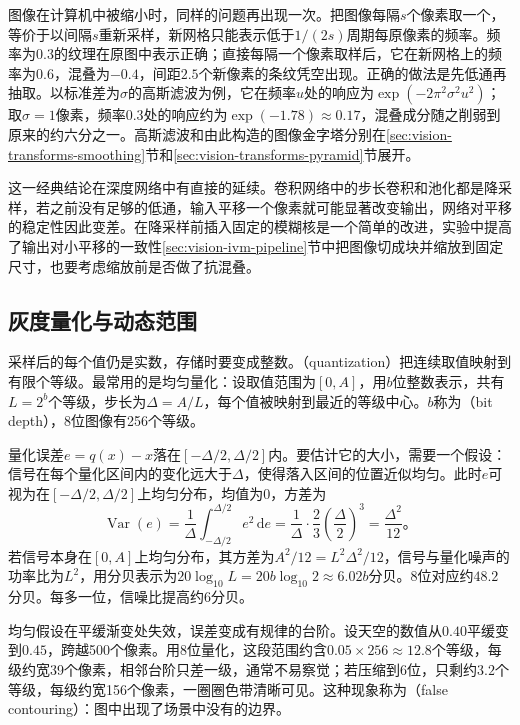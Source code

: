 图像在计算机中被缩小时，同样的问题再出现一次。把图像每隔$s$个像素取一个，等价于以间隔$s$重新采样，新网格只能表示低于$1/(2s)$周期每原像素的频率。频率为$0.3$的纹理在原图中表示正确；直接每隔一个像素取样后，它在新网格上的频率为$0.6$，混叠为$-0.4$，间距$2.5$个新像素的条纹凭空出现。正确的做法是先低通再抽取。以标准差为$\sigma$的高斯滤波为例，它在频率$u$处的响应为$\exp(-2\pi^2\sigma^2u^2)$；取$\sigma=1$像素，频率$0.3$处的响应约为$\exp(-1.78)\approx0.17$，混叠成分随之削弱到原来的约六分之一。高斯滤波和由此构造的图像金字塔分别在\ref{sec:vision-transforms-smoothing}节和\ref{sec:vision-transforms-pyramid}节展开。

这一经典结论在深度网络中有直接的延续。卷积网络中的步长卷积和池化都是降采样，若之前没有足够的低通，输入平移一个像素就可能显著改变输出，网络对平移的稳定性因此变差。在降采样前插入固定的模糊核是一个简单的改进，实验中提高了输出对小平移的一致性\ref{sec:vision-ivm-pipeline}节中把图像切成块并缩放到固定尺寸，也要考虑缩放前是否做了抗混叠。

\subsection{灰度量化与动态范围}
\label{sec:vision-formation-quantization}

采样后的每个值仍是实数，存储时要变成整数。（quantization）把连续取值映射到有限个等级。最常用的是均匀量化：设取值范围为$[0,A]$，用$b$位整数表示，共有$L=2^b$个等级，步长为$\Delta=A/L$，每个值被映射到最近的等级中心。$b$称为（bit depth），8位图像有256个等级。

量化误差$e=q(x)-x$落在$[-\Delta/2,\Delta/2]$内。要估计它的大小，需要一个假设：信号在每个量化区间内的变化远大于$\Delta$，使得落入区间的位置近似均匀。此时$e$可视为在$[-\Delta/2,\Delta/2]$上均匀分布，均值为$0$，方差为
\begin{equation}
  \operatorname{Var}(e)=\frac{1}{\Delta}\int_{-\Delta/2}^{\Delta/2}e^2\,\mathrm{d}e
  =\frac{1}{\Delta}\cdot\frac{2}{3}\left(\frac{\Delta}{2}\right)^3
  =\frac{\Delta^2}{12}\text{。}
  \label{eq:vision-formation-quantization-noise}
\end{equation}
若信号本身在$[0,A]$上均匀分布，其方差为$A^2/12=L^2\Delta^2/12$，信号与量化噪声的功率比为$L^2$，用分贝表示为$20\log_{10}L=20b\log_{10}2\approx6.02b$分贝。8位对应约$48.2$分贝。每多一位，信噪比提高约6分贝。

均匀假设在平缓渐变处失效，误差变成有规律的台阶。设天空的数值从$0.40$平缓变到$0.45$，跨越500个像素。用8位量化，这段范围约含$0.05\times256\approx12.8$个等级，每级约宽39个像素，相邻台阶只差一级，通常不易察觉；若压缩到6位，只剩约$3.2$个等级，每级约宽156个像素，一圈圈色带清晰可见。这种现象称为（false contouring）：图中出现了场景中没有的边界。

